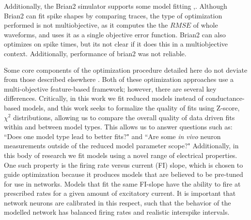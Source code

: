 Additionally, the Brian2 simulator supports some model fitting
\citep{brian2modelfitting},\citep{stimberg2019brian}. Although Brian2 can fit spike shapes by comparing traces, the type of optimization performed is not multiobjective, as it computes the the $RMSE$ of whole waveforms, and uses it as a single objective error function. Brian2 can also optimizes on spike times, but its not clear if it does this in a multiobjective context. Additionally, performance of brian2 was not reliable.



Some core components of the optimization procedure detailed here do not deviate from those described elsewhere \citep{druckmann2008evaluating,bluepyopt}. Both of these optimization approaches use a multi-objective feature-based framework; however, there are several key differences. Critically, in this work we fit reduced models instead of conductance-based models, and this work seeks to formalize the quality of fits using Z-score, $\chi^{2}$ distributions, allowing us to compare the overall quality of data driven fits within and between model types. This allows us to answer questions such as: ``Does one model type lead to better fits?" and ``Are some \emph{in vivo} neuron measurements outside of the reduced model parameter scope?" %
Additionally, in this body of research we fit models using a novel range of electrical properties. One such property is the firing rate versus current (FI) slope, which is chosen to guide optimization because it produces models that are believed to be pre-tuned for use in networks. Models that fit the same FI-slope have the ability to fire at prescribed rates for a given amount of excitatory current. It is important that network neurons are calibrated in this respect, such that the behavior of the modelled network has  balanced firing rates and realistic interspike intervals.